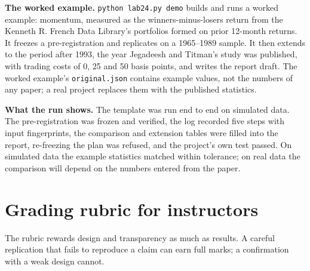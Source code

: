 \textbf{The worked example.} \texttt{python lab24.py demo} builds and runs a worked example: momentum, measured as the winners-minus-losers return from the Kenneth R. French Data Library's portfolios formed on prior 12-month returns. It freezes a pre-registration and replicates on a 1965--1989 sample. It then extends to the period after 1993, the year Jegadeesh and Titman's study was published, with trading costs of 0, 25 and 50 basis points, and writes the report draft. The worked example's \texttt{original.json} contains example values, not the numbers of any paper; a real project replaces them with the published statistics.

\textbf{What the run shows.} The template was run end to end on simulated data. The pre-registration was frozen and verified, the log recorded five steps with input fingerprints, the comparison and extension tables were filled into the report, re-freezing the plan was refused, and the project's own test passed. On simulated data the example statistics matched within tolerance; on real data the comparison will depend on the numbers entered from the paper.

\section{Grading rubric for instructors}
\label{sec:24-rubric}

The rubric rewards design and transparency as much as results. A careful replication that fails to reproduce a claim can earn full marks; a confirmation with a weak design cannot.

